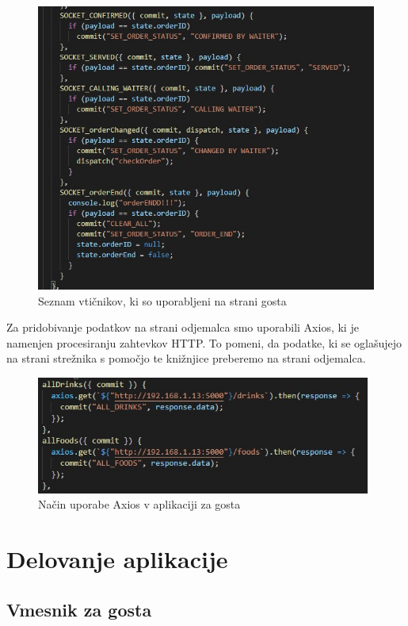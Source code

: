 \documentclass[a4paper, 12pt]{book}
\begin{document}
\begin{figure}[!htb]
\begin{center}
\includegraphics[width=12cm]{socketio_1.jpg}
\end{center}
\caption{Seznam vtičnikov, ki so uporabljeni na strani gosta}
\label{SocketIO_1}
\end{figure}


Za pridobivanje podatkov na strani odjemalca smo uporabili Axios, ki je namenjen procesiranju zahtevkov  HTTP. To pomeni, da podatke, ki se oglašujejo na strani strežnika s pomočjo te knižnjice preberemo na strani odjemalca. 

\begin{figure}[!htb]
\begin{center}
\includegraphics[width=11cm]{axios_1.jpg}
\end{center}
\caption{Način uporabe Axios v aplikaciji za gosta}
\label{axios_1}
\end{figure}


\chapter {Delovanje aplikacije}
\section{Vmesnik za gosta}
\end{document}
